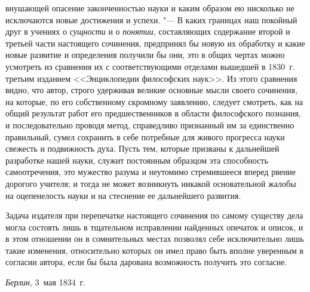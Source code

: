 внушающей опасение законченностью науки и каким образом ею нисколько не
исключаются новые достижения и успехи. "--- В каких границах
наш покойный друг в учениях о {\em сущности} и о
{\em понятии}, составляющих содержание второй и третьей
части настоящего сочинения, предпринял бы новую их обработку и какие новые
развитие и определения получили бы они, это в общих чертах можно усмотреть
из сравнения их с соответствующими отделами вышедшей в 1830~г. третьим
изданием <<Энциклопедии философских наук>>. Из этого сравнения видно, что
автор, строго удерживая великие основные мысли своего сочинения, на
которые, по его собственному скромному заявлению, следует смотреть, как на
общий результат работ его предшественников в области философского познания,
и последовательно проводя метод, справедливо признанный им за единственно
правильный, сумел сохранить в себе потребные для живого прогресса науки
свежесть и подвижность духа. Пусть тем, которые призваны к дальнейшей
разработке нашей науки, служит постоянным образцом эта способность
самоотречения, это мужество разума и неутомимо стремившееся вперед рвение
дорогого учителя; и тогда не может возникнуть никакой основательной жалобы
на оцепенелость науки и на стеснение ее дальнейшего развития.

Задача издателя при перепечатке настоящего сочинения по самому существу дела
могла состоять лишь в тщательном исправлении найденных опечаток и описок, и
в этом отношении он в сомнительных местах позволял себе исключительно лишь
такие изменения, относительно которых он имел право быть вполне уверенным в
согласии автора, если бы была дарована возможность получить это согласие.

{\em Берлин}, 3~мая 1834~г.
